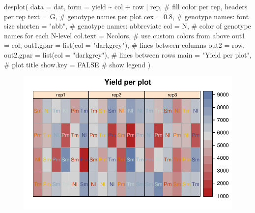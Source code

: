 \documentclass[
  letterpaper,
  DIV=11,
  numbers=noendperiod]{scrartcl}
\newenvironment{Shaded}{\begin{snugshade}}{\end{snugshade}}
\newcommand{\AttributeTok}[1]{\textcolor[rgb]{0.40,0.45,0.13}{#1}}
\newcommand{\CommentTok}[1]{\textcolor[rgb]{0.37,0.37,0.37}{#1}}
\newcommand{\ConstantTok}[1]{\textcolor[rgb]{0.56,0.35,0.01}{#1}}
\newcommand{\FloatTok}[1]{\textcolor[rgb]{0.68,0.00,0.00}{#1}}
\newcommand{\FunctionTok}[1]{\textcolor[rgb]{0.28,0.35,0.67}{#1}}
\newcommand{\NormalTok}[1]{\textcolor[rgb]{0.00,0.23,0.31}{#1}}
\newcommand{\SpecialCharTok}[1]{\textcolor[rgb]{0.37,0.37,0.37}{#1}}
\newcommand{\StringTok}[1]{\textcolor[rgb]{0.13,0.47,0.30}{#1}}
\begin{document}
\begin{Shaded}
\begin{Highlighting}[]
\FunctionTok{desplot}\NormalTok{(}
  \AttributeTok{data =}\NormalTok{ dat,}
  \AttributeTok{form =}\NormalTok{ yield }\SpecialCharTok{\textasciitilde{}}\NormalTok{ col }\SpecialCharTok{+}\NormalTok{ row }\SpecialCharTok{|}\NormalTok{ rep, }\CommentTok{\# fill color per rep, headers per rep}
  \AttributeTok{text =}\NormalTok{ G, }\CommentTok{\# genotype names per plot}
  \AttributeTok{cex =} \FloatTok{0.8}\NormalTok{, }\CommentTok{\# genotype names: font size}
  \AttributeTok{shorten =} \StringTok{"abb"}\NormalTok{, }\CommentTok{\# genotype names: abbreviate}
  \AttributeTok{col  =}\NormalTok{ N, }\CommentTok{\# color of genotype names for each N{-}level}
  \AttributeTok{col.text =}\NormalTok{ Ncolors, }\CommentTok{\# use custom colors from above}
  \AttributeTok{out1 =}\NormalTok{ col, }\AttributeTok{out1.gpar =} \FunctionTok{list}\NormalTok{(}\AttributeTok{col =} \StringTok{"darkgrey"}\NormalTok{), }\CommentTok{\# lines between columns}
  \AttributeTok{out2 =}\NormalTok{ row, }\AttributeTok{out2.gpar =} \FunctionTok{list}\NormalTok{(}\AttributeTok{col =} \StringTok{"darkgrey"}\NormalTok{), }\CommentTok{\# lines between rows}
  \AttributeTok{main =} \StringTok{"Yield per plot"}\NormalTok{, }\CommentTok{\# plot title}
  \AttributeTok{show.key =} \ConstantTok{FALSE} \CommentTok{\# show legend}
\NormalTok{  )}
\end{Highlighting}
\end{Shaded}

\begin{figure}[H]

{\centering \includegraphics{splitplot_gomezgomez1984_files/figure-pdf/unnamed-chunk-11-1.pdf}

}

\end{figure}
\end{document}
